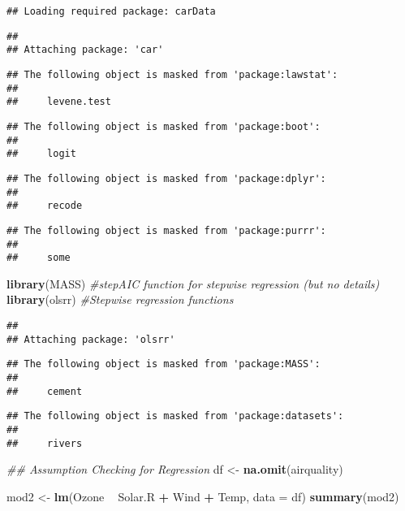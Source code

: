 \documentclass[]{article}
\newenvironment{Shaded}{\begin{snugshade}}{\end{snugshade}}
\newcommand{\CommentTok}[1]{\textcolor[rgb]{0.56,0.35,0.01}{\textit{#1}}}
\newcommand{\DataTypeTok}[1]{\textcolor[rgb]{0.13,0.29,0.53}{#1}}
\newcommand{\KeywordTok}[1]{\textcolor[rgb]{0.13,0.29,0.53}{\textbf{#1}}}
\newcommand{\NormalTok}[1]{#1}
\newcommand{\OperatorTok}[1]{\textcolor[rgb]{0.81,0.36,0.00}{\textbf{#1}}}
\newcommand{\StringTok}[1]{\textcolor[rgb]{0.31,0.60,0.02}{#1}}
\begin{document}
\begin{verbatim}
## Loading required package: carData
\end{verbatim}

\begin{verbatim}
## 
## Attaching package: 'car'
\end{verbatim}

\begin{verbatim}
## The following object is masked from 'package:lawstat':
## 
##     levene.test
\end{verbatim}

\begin{verbatim}
## The following object is masked from 'package:boot':
## 
##     logit
\end{verbatim}

\begin{verbatim}
## The following object is masked from 'package:dplyr':
## 
##     recode
\end{verbatim}

\begin{verbatim}
## The following object is masked from 'package:purrr':
## 
##     some
\end{verbatim}

\begin{Shaded}
\begin{Highlighting}[]
\KeywordTok{library}\NormalTok{(MASS)       }\CommentTok{#stepAIC function for stepwise regression (but no details)}
\KeywordTok{library}\NormalTok{(olsrr)      }\CommentTok{#Stepwise regression functions}
\end{Highlighting}
\end{Shaded}

\begin{verbatim}
## 
## Attaching package: 'olsrr'
\end{verbatim}

\begin{verbatim}
## The following object is masked from 'package:MASS':
## 
##     cement
\end{verbatim}

\begin{verbatim}
## The following object is masked from 'package:datasets':
## 
##     rivers
\end{verbatim}

\begin{Shaded}
\begin{Highlighting}[]
\CommentTok{## Assumption Checking for Regression}
\NormalTok{df <-}\StringTok{ }\KeywordTok{na.omit}\NormalTok{(airquality)}

\NormalTok{mod2 <-}\StringTok{ }\KeywordTok{lm}\NormalTok{(Ozone }\OperatorTok{~}\StringTok{ }\NormalTok{Solar.R }\OperatorTok{+}\StringTok{ }\NormalTok{Wind }\OperatorTok{+}\StringTok{ }\NormalTok{Temp, }\DataTypeTok{data =}\NormalTok{ df)}
\KeywordTok{summary}\NormalTok{(mod2)}
\end{Highlighting}
\end{Shaded}
\end{document}
